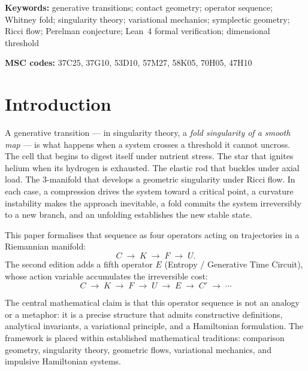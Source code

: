 \documentclass[14pt,a4paper]{extarticle}
\begin{document}
\textbf{Keywords:} generative transitions; contact geometry;
operator sequence; Whitney fold; singularity theory; variational
mechanics; symplectic geometry; Ricci flow; Perelman conjecture;
Lean~4 formal verification; dimensional threshold

\textbf{MSC codes:} 37C25, 37G10, 53D10, 57M27, 58K05, 70H05, 47H10

\tableofcontents
\bigskip

\section{Introduction}
\label{sec:intro}

A generative transition --- in singularity theory, a \emph{fold singularity
of a smooth map} \cite{Whitney1955} --- is what happens when a system crosses
a threshold it cannot uncross.
The cell that begins to digest itself under nutrient stress.
The star that ignites helium when its hydrogen is exhausted.
The elastic rod that buckles under axial load.
The 3-manifold that develops a geometric singularity under Ricci flow.
In each case, a compression drives the system toward a critical point,
a curvature instability makes the approach inevitable, a fold commits
the system irreversibly to a new branch, and an unfolding establishes
the new stable state.

This paper formalises that sequence as four operators acting on
trajectories in a Riemannian manifold:
\[
  C \;\longrightarrow\; K \;\longrightarrow\; F
  \;\longrightarrow\; U.
\]
The second edition adds a fifth operator $E$ (Entropy / Generative
Time Circuit), whose action variable accumulates the irreversible cost:
\[
  C \;\longrightarrow\; K \;\longrightarrow\; F
  \;\longrightarrow\; U \;\longrightarrow\; E \;\longrightarrow\; C'
  \;\longrightarrow\; \cdots
\]

The central mathematical claim is that this operator sequence is not
an analogy or a metaphor: it is a precise structure that admits
constructive definitions, analytical invariants, a variational
principle, and a Hamiltonian formulation.
The framework is placed within established mathematical traditions:
comparison geometry, singularity theory, geometric flows, variational
mechanics, and impulsive Hamiltonian systems.
\end{document}

